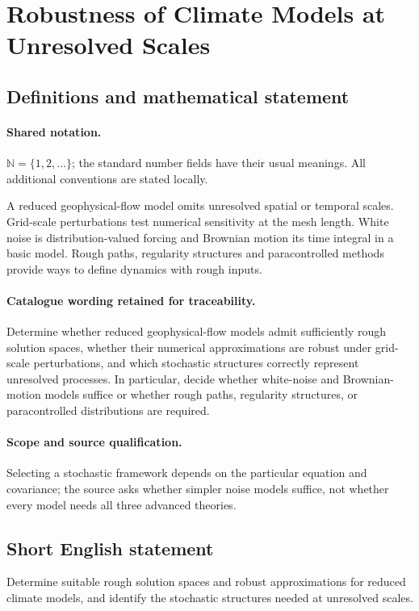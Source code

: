 \documentclass[11pt]{article}
\begin{document}
\section{Robustness of Climate Models at Unresolved Scales}\label{statement}

\subsection{Definitions and mathematical statement}

\paragraph{Shared notation.}$\mathbb N=\{1,2,\ldots\}$; the standard number fields have their usual meanings. All additional conventions are stated locally.


A reduced geophysical-flow model omits unresolved spatial or temporal scales. Grid-scale perturbations test numerical sensitivity at the mesh length. White noise is distribution-valued forcing and Brownian motion its time integral in a basic model. Rough paths, regularity structures and paracontrolled methods provide ways to define dynamics with rough inputs.

\paragraph{Catalogue wording retained for traceability.}
Determine whether reduced geophysical-flow models admit sufficiently rough solution spaces, whether their numerical approximations are robust under grid-scale perturbations, and which stochastic structures correctly represent unresolved processes. In particular, decide whether white-noise and Brownian-motion models suffice or whether rough paths, regularity structures, or paracontrolled distributions are required.

\paragraph{Scope and source qualification.}Selecting a stochastic framework depends on the particular equation and covariance; the source asks whether simpler noise models suffice, not whether every model needs all three advanced theories.
\subsection{Short English statement}
Determine suitable rough solution spaces and robust approximations for reduced climate models, and identify the stochastic structures needed at unresolved scales.
\end{document}
